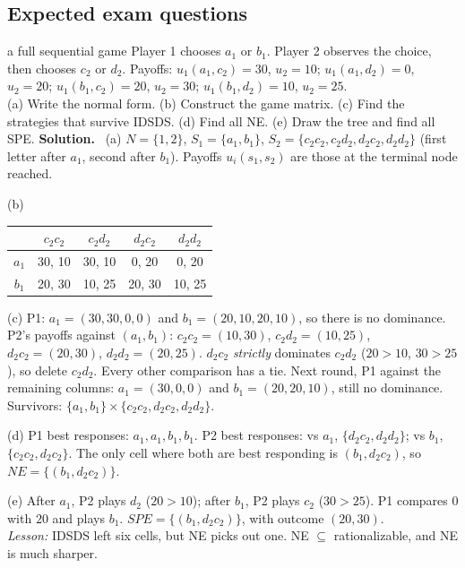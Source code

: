\documentclass[11pt]{article}
\newcommand{\soln}{\tcblower\textbf{Solution.}\ }
\begin{document}
\subsection{Expected exam questions}
\begin{examq}{a full sequential game}
Player 1 chooses $a_1$ or $b_1$. Player 2 observes the choice, then chooses $c_2$ or $d_2$. Payoffs: $u_1(a_1,c_2)=30$, $u_2=10$; $u_1(a_1,d_2)=0$, $u_2=20$; $u_1(b_1,c_2)=20$, $u_2=30$; $u_1(b_1,d_2)=10$, $u_2=25$.\\
(a) Write the normal form. (b) Construct the game matrix. (c) Find the strategies that survive IDSDS. (d) Find all NE. (e) Draw the tree and find all SPE.
\soln
(a) $N=\{1,2\}$, $S_1=\{a_1,b_1\}$, $S_2=\{c_2c_2,c_2d_2,d_2c_2,d_2d_2\}$ (first letter after $a_1$, second after $b_1$). Payoffs $u_i(s_1,s_2)$ are those at the terminal node reached.

(b)
\begin{center}
\begin{tabular}{c|cccc}
 & $c_2c_2$ & $c_2d_2$ & $d_2c_2$ & $d_2d_2$\\\hline
$a_1$ & 30, 10 & 30, 10 & 0, 20 & 0, 20\\
$b_1$ & 20, 30 & 10, 25 & 20, 30 & 10, 25
\end{tabular}
\end{center}
(c) P1: $a_1=(30,30,0,0)$ and $b_1=(20,10,20,10)$, so there is no dominance. P2's payoffs against $(a_1,b_1)$: $c_2c_2=(10,30)$, $c_2d_2=(10,25)$, $d_2c_2=(20,30)$, $d_2d_2=(20,25)$. $d_2c_2$ \emph{strictly} dominates $c_2d_2$ ($20>10$, $30>25$), so delete $c_2d_2$. Every other comparison has a tie. Next round, P1 against the remaining columns: $a_1=(30,0,0)$ and $b_1=(20,20,10)$, still no dominance. Survivors: $\{a_1,b_1\}\times\{c_2c_2,d_2c_2,d_2d_2\}$.

(d) P1 best responses: $a_1,a_1,b_1,b_1$. P2 best responses: vs $a_1$, $\{d_2c_2,d_2d_2\}$; vs $b_1$, $\{c_2c_2,d_2c_2\}$. The only cell where both are best responding is $(b_1,d_2c_2)$, so $NE=\{(b_1,d_2c_2)\}$.

(e) After $a_1$, P2 plays $d_2$ ($20>10$); after $b_1$, P2 plays $c_2$ ($30>25$). P1 compares $0$ with $20$ and plays $b_1$. $SPE=\{(b_1,d_2c_2)\}$, with outcome $(20,30)$.\\
\emph{Lesson:} IDSDS left six cells, but NE picks out one. NE $\subseteq$ rationalizable, and NE is much sharper.
\end{examq}
\end{document}
